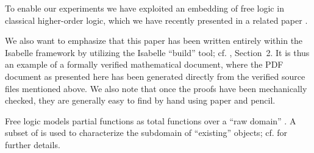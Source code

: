 \begin{isabellebody}
\begin{isamarkuptext}
To enable our experiments we have exploited an embedding of free logic \cite{Scott67} 
in classical higher-order logic, which we have recently presented in a related paper \cite{C57}.


We also want to emphasize that this paper has been written entirely within the Isabelle 
framework by utilizing the Isabelle ``build'' tool; cf. \cite{IsabelleManual2016}, Section~2. 
It is thus an example of a formally verified mathematical document, where the PDF document as 
presented here has been generated directly from the verified source files mentioned above.
We also note that once the proofs have been mechanically checked, they are generally easy 
to find by hand using paper and pencil.%
\end{isamarkuptext}\isamarkuptrue%
%
\isamarkuptrue%
%
\begin{isamarkuptext}%
Free logic models partial functions as total functions over a ``raw domain'' . 
A subset  of  is used to characterize the subdomain of ``existing'' objects; cf.
\cite{Scott67} for further details.


\end{isamarkuptext}
\end{isabellebody}
